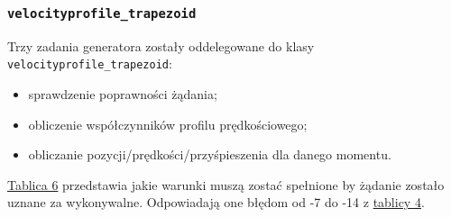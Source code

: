 \documentclass[a4paper, 12pt]{article}
\begin{document}
	\subsubsection{\texttt{velocityprofile\_trapezoid}}
	Trzy zadania generatora zostały oddelegowane do klasy \texttt{velocityprofile\_trapezoid}:
	\begin{itemize}
	\item sprawdzenie poprawności żądania;
	\item obliczenie współczynników profilu prędkościowego; 
	\item obliczanie pozycji/prędkości/przyśpieszenia dla danego momentu.
	\end{itemize}
	\hyperref[tab:velProfConds]{Tablica 6} przedstawia jakie warunki muszą zostać spełnione by żądanie zostało uznane za wykonywalne. Odpowiadają one błędom od -7 do -14 z \hyperref[tab:resultcodes]{tablicy 4}.
\end{document}
